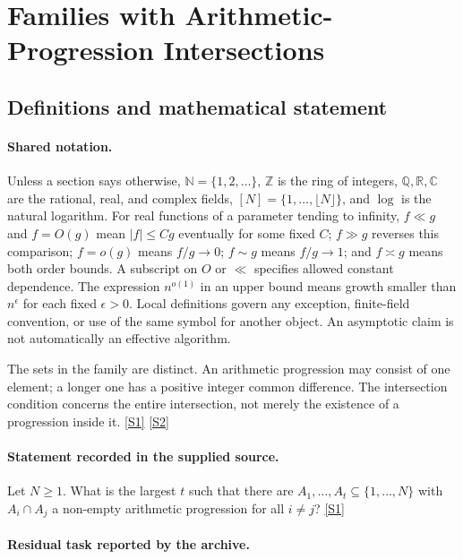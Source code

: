 \documentclass[11pt,a4paper]{article}
\newcommand{\N}{\mathbb{N}}
\newcommand{\Z}{\mathbb{Z}}
\newcommand{\Q}{\mathbb{Q}}
\newcommand{\R}{\mathbb{R}}
\newcommand{\C}{\mathbb{C}}
\newcommand{\sref}[2]{\hyperlink{source:#1:#2}{[S#2]}}
\begin{document}
\section{Families with Arithmetic-Progression Intersections}\label{statement}


\subsection{Definitions and mathematical statement}

\paragraph{Shared notation.}Unless a section says otherwise, $\N=\{1,2,\ldots\}$,
$\Z$ is the ring of integers, $\Q,\R,\C$ are the rational, real, and complex
fields, $[N]=\{1,\ldots,\lfloor N\rfloor\}$, and $\log$ is the natural
logarithm. For real functions of a parameter tending to infinity,
$f\ll g$ and $f=O(g)$ mean $|f|\leq Cg$ eventually for some fixed $C$;
$f\gg g$ reverses this comparison; $f=o(g)$ means $f/g\to0$;
$f\sim g$ means $f/g\to1$; and $f\asymp g$ means both order bounds.
A subscript on $O$ or $\ll$ specifies allowed constant dependence.
The expression $n^{o(1)}$ in an upper bound means growth smaller than
$n^\epsilon$ for each fixed $\epsilon>0$. Local definitions govern any
exception, finite-field convention, or use of the same symbol for another
object. An asymptotic claim is not automatically an effective algorithm.



The sets in the family are distinct. An arithmetic progression may consist of one element; a longer one has a positive integer common difference. The intersection condition concerns the entire intersection, not merely the existence of a progression inside it. \sref{statement}{1} \sref{statement}{2}

\paragraph{Statement recorded in the supplied source.}
Let $N\geq 1$. What is the largest $t$ such that there are $A_1,\ldots,A_t\subseteq \{1,\ldots,N\}$ with $A_i\cap A_j$ a non-empty arithmetic progression for all $i\neq j$? \sref{statement}{1}

\paragraph{Residual task reported by the archive.}
\end{document}
